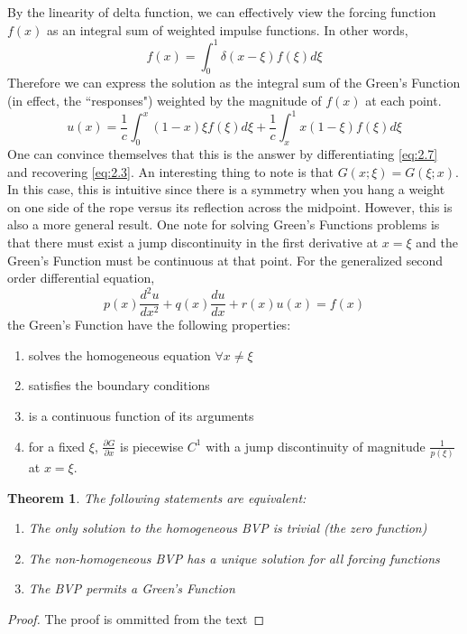 \documentclass{article}
\newcommand{\pd}[2]{\frac{\partial #1}{\partial #2}}
\newcommand{\od}[2]{\frac{d #1}{d #2}}
\newcommand{\odt}[2]{\frac{d^2 #1}{d #2 ^2}}
\newtheorem{theorem}{Theorem}[section]
\numberwithin{equation}{section}
\begin{document}
By the linearity of delta function, we can effectively view the forcing function $f(x)$ as an integral sum of weighted impulse functions. In other words,
\begin{equation*}
    f(x) = \int_0^1 \delta (x-\xi)f(\xi)d\xi
\end{equation*}
Therefore we can express the solution as the integral sum of the Green's Function (in effect, the ``responses") weighted by the magnitude of $f(x)$ at each point.
\begin{equation}
    u(x) = \frac{1}{c}\int_0^x(1-x)\xi f(\xi)d\xi + \frac{1}{c}\int_x^1 x(1-\xi)f(\xi)d\xi \label{eq:2.7}
\end{equation}
One can convince themselves that this is the answer by differentiating \eqref{eq:2.7} and recovering \eqref{eq:2.3}. An interesting thing to note is that $G(x;\xi) = G(\xi;x)$. In this case, this is intuitive since there is a symmetry when you hang a weight on one side of the rope versus its reflection across the midpoint. However, this is also a more general result. One note for solving Green's Functions problems is that there must exist a jump discontinuity in the first derivative at $x=\xi$ and the Green's Function must be continuous at that point. For the generalized second order differential equation,
\begin{equation}
    p(x)\odt{u}{x} + q(x)\od{u}{x}+r(x)u(x)=f(x) \label{eq:2.8}
\end{equation}
the Green's Function have the following properties:
\begin{enumerate}[label=\roman*)]
    \item solves the homogeneous equation $\forall x\neq\xi$
    \item satisfies the boundary conditions
    \item is a continuous function of its arguments
    \item for a fixed $\xi$, $\pd{G}{x}$ is piecewise $C^1$ with a jump discontinuity of magnitude $\frac{1}{p(\xi)}$ at $x=\xi$.
\end{enumerate}
\begin{theorem}
    The following statements are equivalent:
    \begin{enumerate}
        \item The only solution to the homogeneous BVP is trivial (the zero function)
        \item The non-homogeneous BVP has a unique solution for all forcing functions
        \item The BVP permits a Green's Function
    \end{enumerate}
\end{theorem}
\begin{proof}
    The proof is ommitted from the text
\end{proof}
\end{document}
